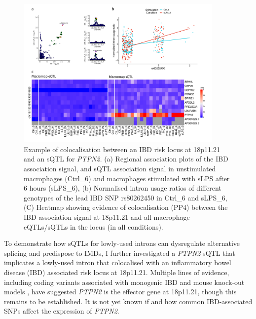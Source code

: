 \begin{figure}[H]
  \centering
  \includegraphics[width=0.9\textwidth]{ptpn2_manhattan_heatmap}
  \caption[Colocalisation between a low-usage \textit{PTPN2} intron and an IBD-associated locus]{Example of colocalisation between an IBD risk locus at 18p11.21 and an sQTL for \textit{PTPN2}.  (a) Regional association plots of the IBD association signal, and sQTL association signal in unstimulated macrophages (Ctrl\_6) and macrophages stimulated with sLPS after 6 hours (sLPS\_6), (b) Normalised intron usage ratios of different genotypes of the lead IBD SNP rs80262450 in Ctrl\_6 and sLPS\_6, (C) Heatmap showing evidence of colocalisation (PP4) between the IBD association signal at 18p11.21 and all macrophage eQTLs/sQTLs in the locus (in all conditions).}
  \label{fig:ptpn2_manhattan_heatmap}   
\end{figure}
To demonstrate how sQTLs for lowly-used introns can dysregulate alternative splicing and predispose to IMDs, I further investigated a \textit{PTPN2} sQTL that implicates a lowly-used intron that colocalised with an inflammatory bowel disease (IBD) associated risk locus at 18p11.21. Multiple lines of evidence, including coding variants associated with monogenic IBD \cite{Parlato2020-lh,Pike2018-wn} and mouse knock-out models \cite{Spalinger2018-mb,Spalinger2022-xj}, have suggested \textit{PTPN2} is the effector gene at 18p11.21, though this remains to be established. It is not yet known if and how common IBD-associated SNPs affect the expression of \textit{PTPN2}. \\

